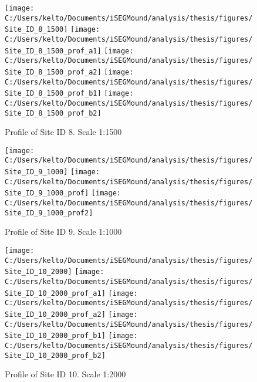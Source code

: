 \documentclass[
  12pt,
]{article}
\begin{document}
\begin{figure}
\texttt{[image: C:/Users/kelto/Documents/iSEGMound/analysis/thesis/figures/Site\_ID\_8\_1500]} \texttt{[image: C:/Users/kelto/Documents/iSEGMound/analysis/thesis/figures/Site\_ID\_8\_1500\_prof\_a1]} \texttt{[image: C:/Users/kelto/Documents/iSEGMound/analysis/thesis/figures/Site\_ID\_8\_1500\_prof\_a2]} \texttt{[image: C:/Users/kelto/Documents/iSEGMound/analysis/thesis/figures/Site\_ID\_8\_1500\_prof\_b1]} \texttt{[image: C:/Users/kelto/Documents/iSEGMound/analysis/thesis/figures/Site\_ID\_8\_1500\_prof\_b2]} \caption{Profile of Site ID 8. Scale 1:1500}\label{fig:FigureAOI4-8}
\end{figure}

\begin{figure}
\texttt{[image: C:/Users/kelto/Documents/iSEGMound/analysis/thesis/figures/Site\_ID\_9\_1000]} \texttt{[image: C:/Users/kelto/Documents/iSEGMound/analysis/thesis/figures/Site\_ID\_9\_1000\_prof]} \texttt{[image: C:/Users/kelto/Documents/iSEGMound/analysis/thesis/figures/Site\_ID\_9\_1000\_prof2]} \caption{Profile of Site ID 9. Scale 1:1000}\label{fig:FigureAOI4-9}
\end{figure}

\begin{figure}
\texttt{[image: C:/Users/kelto/Documents/iSEGMound/analysis/thesis/figures/Site\_ID\_10\_2000]} \texttt{[image: C:/Users/kelto/Documents/iSEGMound/analysis/thesis/figures/Site\_ID\_10\_2000\_prof\_a1]} \texttt{[image: C:/Users/kelto/Documents/iSEGMound/analysis/thesis/figures/Site\_ID\_10\_2000\_prof\_a2]} \texttt{[image: C:/Users/kelto/Documents/iSEGMound/analysis/thesis/figures/Site\_ID\_10\_2000\_prof\_b1]} \texttt{[image: C:/Users/kelto/Documents/iSEGMound/analysis/thesis/figures/Site\_ID\_10\_2000\_prof\_b2]} \caption{Profile of Site ID 10. Scale 1:2000}\label{fig:FigureAOI4-10}
\end{figure}
\end{document}
